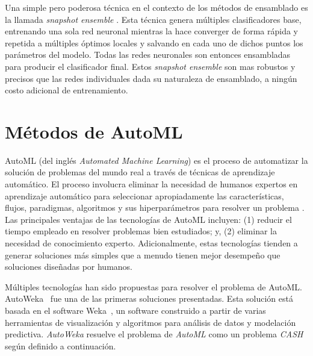 Una simple pero poderosa técnica en el contexto de los métodos de ensamblado es la llamada \textit{snapshot ensemble} \parencite{huang17snapshot}. Esta técnica genera múltiples clasificadores base, entrenando una sola red neuronal mientras la hace converger de forma rápida y repetida a múltiples óptimos locales y salvando en cada uno de dichos puntos los parámetros del modelo. Todas las redes neuronales son entonces ensambladas para producir el clasificador final. Estos \textit{snapshot ensemble} son mas robustos y precisos que las redes individuales dada su naturaleza de ensamblado, a ningún costo adicional de entrenamiento.

\section{Métodos de AutoML}\label{section:automl}

AutoML (del inglés \textit{Automated Machine Learning}) es el proceso de automatizar la solución de problemas del mundo real a través de técnicas de aprendizaje automático.
El proceso involucra eliminar la necesidad de humanos expertos en aprendizaje automático para seleccionar apropiadamente las características, flujos, paradigmas, algoritmos y sus hiperparámetros para resolver un problema \parencite{Dimitrakakis_Liu_Parkes_Radanovic_2019}.
Las principales ventajas de las tecnologías de AutoML incluyen:
(1) reducir el tiempo empleado en resolver problemas bien estudiados; y,
(2) eliminar la necesidad de conocimiento experto.
Adicionalmente, estas tecnologías tienden a generar soluciones más simples que a menudo tienen mejor desempeño que soluciones diseñadas por humanos.

Múltiples tecnologías han sido propuestas para resolver el problema de AutoML. AutoWeka~\parencite{autoweka} fue una de las primeras soluciones presentadas.
Esta solución está basada en el software Weka~\parencite{weka}, un software construido a partir de varias herramientas de visualización y algoritmos para análisis de datos y modelación predictiva. \textit{AutoWeka} resuelve el problema de \textit{AutoML} como un problema \emph{CASH} según definido a continuación.

